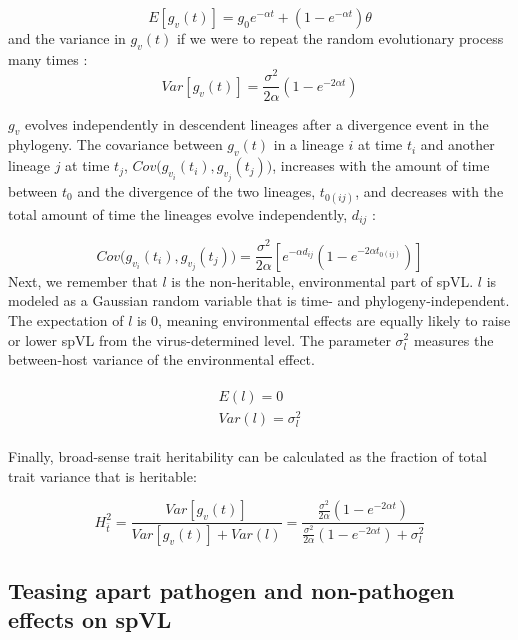 \documentclass[11pt]{article}
\begin{document}
\begin{linenumbers}
\begin{equation}
   E[g_v(t)] = g_0e^{-\alpha t} + (1 - e^{-\alpha t})\theta \label{eq:OUmean}
\end{equation}
and the variance in $g_v(t)$ if we were to repeat the random evolutionary process many times \citep{Butler2004}:
\begin{equation}
    Var[g_v(t)] = \frac{\sigma^2}{2\alpha}(1 - e^{-2\alpha t}) \label{eq:OUVar}
\end{equation}

$g_v$ evolves independently in descendent lineages after a divergence event in the phylogeny. The covariance between $g_v(t)$ in a lineage $i$ at time $t_i$ and another lineage $j$ at time $t_j$, $Cov\big(g_{v_i}(t_i), g_{v_j}(t_j)\big)$, increases with the amount of time between $t_0$ and the divergence of the two lineages, $t_{0(ij)}$, and decreases with the total amount of time the lineages evolve independently, $d_{ij}$ \citep{Butler2004}: 

\begin{equation}
	Cov\big(g_{v_i}(t_i), g_{v_j}(t_j)\big) = \frac{\sigma^2}{2\alpha}[e^{-\alpha d_{ij}}(1 - e^{-2\alpha t_{0(ij)}})]
	\label{eq:OUcov}
\end{equation}
Next, we remember that $l$ is the non-heritable, environmental part of spVL. $l$ is modeled as a Gaussian random variable that is time- and phylogeny-independent. The expectation of $l$ is 0, meaning environmental effects are equally likely to raise or lower spVL from the virus-determined level. The parameter $\sigma_l^2$ measures the between-host variance of the environmental effect.

\begin{align}
\begin{split}
	E(l) = 0 \\
	Var(l) = \sigma^2_l
\end{split}
\end{align}

Finally, broad-sense trait heritability can be calculated as the fraction of total trait variance that is heritable:

\begin{equation}
	H^2_{\bar{t}} = \frac{Var[g_v(t)]}{Var[g_v(t)] + Var(l)} = \frac{\frac{\sigma^2}{2\alpha}(1 - e^{-2\alpha t})}{\frac{\sigma^2}{2\alpha}(1 - e^{-2\alpha t}) + \sigma^2_l}
\end{equation}

\subsection*{Teasing apart pathogen and non-pathogen effects on spVL}


\end{linenumbers}
\end{document}
